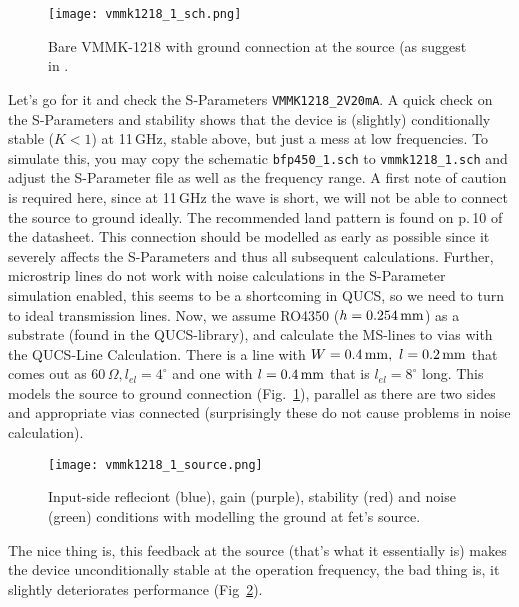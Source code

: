 \begin{figure}
  \centering
  {\texttt{[image: vmmk1218\_1\_sch.png]}}
  \caption{Bare VMMK-1218 with ground connection at the source (as
    suggest in \cite{avagovmmk1218}.}
  \label{fig:vmmk1218_1_sch}
\end{figure}

Let's go for it and check the S-Parameters \texttt{VMMK1218\_2V20mA}. A
quick check on the S-Parameters and stability shows that the device is
(slightly) conditionally stable ($K<1$) at 11\,GHz, stable above, but
just a mess at low frequencies. To simulate this, you may copy the
schematic \texttt{bfp450\_1.sch} to \texttt{vmmk1218\_1.sch} and adjust the
S-Parameter file as well as the frequency range. A first note of
caution is required here, since at 11\,GHz the wave is short, we will
not be able to connect the source to ground ideally. The recommended
land pattern is found on p.\,10 of the datasheet. This connection
should be modelled as early as possible since it severely affects the
S-Parameters and thus all subsequent calculations. Further, microstrip
lines do not work with noise calculations in the S-Parameter
simulation enabled, this seems to be a shortcoming in QUCS, so we need
to turn to ideal transmission lines. Now, we assume RO4350
($h=0.254\,\mathrm{mm}$) as a substrate (found in the QUCS-library), and
calculate the MS-lines to vias with the QUCS-Line Calculation. There
is a line with $W=0.4\,\mathrm{mm},\ l=0.2\,\mathrm{mm}$ that comes out as
$60\,\Omega, l_{el}=4^\circ$ and one with $l=0.4\,\mathrm{mm}$ that is
$l_{el}=8^\circ$ long. This models the source to ground connection
(Fig.~\ref{fig:vmmk1218_1_sch}), parallel as there are two sides and
appropriate vias connected (surprisingly these do not cause problems
in noise calculation).

\begin{figure}
  \centering
  {\texttt{[image: vmmk1218\_1\_source.png]}}
  \caption{Input-side refleciont (blue), gain (purple), stability
    (red) and noise (green) conditions with modelling the ground at
    fet's source.}
  \label{fig:vmmk1218_1_source}
\end{figure}

The nice thing is, this feedback at the source (that's what it
essentially is) makes the device unconditionally stable at the
operation frequency, the bad thing is, it slightly deteriorates
performance (Fig~\ref{fig:vmmk1218_1_source}). 

\label{ch:match1}

